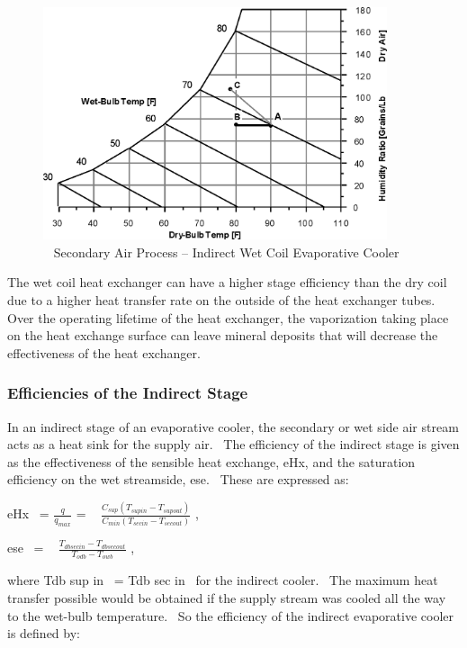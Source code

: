 \begin{figure}[hbtp] %
\centering
\includegraphics[width=0.9\textwidth, height=0.9\textheight, keepaspectratio=true]{media/image4798.png}
\caption{  Secondary Air Process – Indirect Wet Coil Evaporative Cooler \protect \label{fig:secondary-air-process-indirect-wet-coil}}
\end{figure}

The wet coil heat exchanger can have a higher stage efficiency than the dry coil due to a higher heat transfer rate on the outside of the heat exchanger tubes.~ Over the operating lifetime of the heat exchanger, the vaporization taking place on the heat exchange surface can leave mineral deposits that will decrease the effectiveness of the heat exchanger.

\subsubsection{Efficiencies of the Indirect Stage}\label{efficiencies-of-the-indirect-stage}

In an indirect stage of an evaporative cooler, the secondary or wet side air stream acts as a heat sink for the supply air.~ The efficiency of the indirect stage is given as the effectiveness of the sensible heat exchange, eHx, and the saturation efficiency on the wet streamside, ese.~ These are expressed as:

eHx~ = \(\frac{q}{{{q_{max}}}}\) = ~ \(\frac{{{C_{sup}}({T_{supin}} - {T_{supout}})}}{{{C_{min}}({T_{secin}} - {T_{secout}})}}\) ,

ese~ = ~ \(\frac{{{T_{dbsecin}} - {T_{dbsecout}}}}{{{T_{odb}} - {T_{owb}}}}\) ,

where Tdb sup in~ = Tdb sec in~ for the indirect cooler.~ The maximum heat transfer possible would be obtained if the supply stream was cooled all the way to the wet-bulb temperature.~ So the efficiency of the indirect evaporative cooler is defined by:


